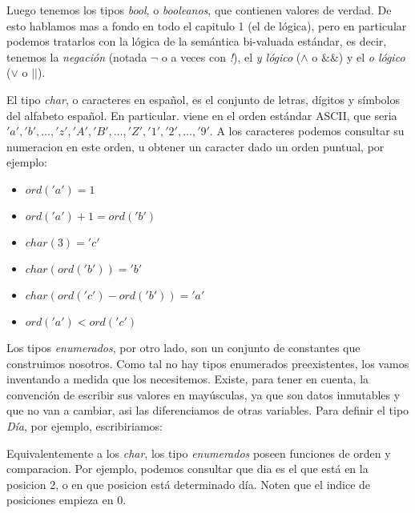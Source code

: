 \documentclass{article}
\begin{document}
Luego tenemos los tipos \textit{bool}, o \textit{booleanos}, que contienen valores de verdad. De esto hablamos mas a fondo en todo el capitulo 1 (el de lógica), pero en particular podemos tratarlos con la lógica de la semántica bi-valuada estándar, es decir, tenemos la \textit{negación} (notada $\neg$ o a veces con \textit{!}), el \textit{y lógico} ($\land$ o $\&\&$) y el \textit{o lógico} ($\lor$ o $||$).

El tipo \textit{char}, o caracteres en español, es el conjunto de letras, dígitos y símbolos del alfabeto español. En particular. viene en el orden estándar ASCII, que seria $'a', 'b', \ldots, 'z', 'A', 'B', \ldots, 'Z', '1', '2', \ldots, '9'$. A los caracteres podemos consultar su numeracion en este orden, u obtener un caracter dado un orden puntual, por ejemplo:

\begin{multicols}{2}
\begin{center}
	\begin{itemize}
	
		\item[] $ord('a') = 1$
		\item[] $ord('a') + 1 = ord('b')$
		
		\item[] $char(3) = 'c'$
		\item[] $char(ord('b')) = 'b'$
		
		\item[] $char(ord('c') - ord('b')) = 'a'$
		\item[] $ord('a') < ord('c')$
	
	\end{itemize}
\end{center}
\end{multicols}

Los tipos \textit{enumerados}, por otro lado, son un conjunto de constantes que construimos nosotros. Como tal no hay tipos enumerados preexistentes, los vamos inventando a medida que los necesitemos. Existe, para tener en cuenta, la convención de escribir sus valores en mayúsculas, ya que son datos inmutables y que no van a cambiar, asi las diferenciamos de otras variables. Para definir el tipo \textit{Día}, por ejemplo, escribiriamos:


Equivalentemente a los \textit{char}, los tipo \textit{enumerados} poseen funciones de orden y comparacion. Por ejemplo, podemos consultar que dia es el que está en la posicion 2, o en que posicion está determinado día. Noten que el indice de posiciones empieza en 0.
\end{document}
